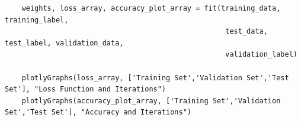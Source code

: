 \documentclass{article}
\begin{document}
\begin{lstlisting}
    weights, loss_array, accuracy_plot_array = fit(training_data, training_label, 
                                                    test_data, test_label, validation_data, 
                                                    validation_label)    
    
    plotlyGraphs(loss_array, ['Training Set','Validation Set','Test Set'], "Loss Function and Iterations")
    plotlyGraphs(accuracy_plot_array, ['Training Set','Validation Set','Test Set'], "Accuracy and Iterations")
    
\end{lstlisting}
\end{document}
